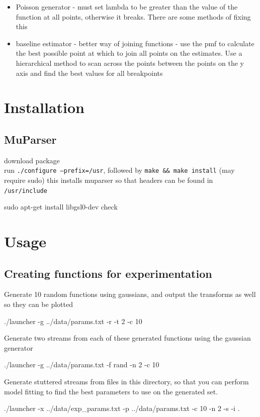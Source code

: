 \documentclass[a4paper,11pt]{article}
\begin{document}
\begin{itemize}
\item Poisson generator - must set lambda to be greater than the value of the
  function at all points, otherwise it breaks. There are some methods of fixing this
\item baseline estimator - better way of joining functions - use the pmf to
  calculate the best possible point at which to join all points on the
  estimates. Use a hierarchical method to scan across the points between the
  points on the y axis and find the best values for all breakpoints
\end{itemize}
\newpage
\printbibliography
\newpage
\begin{appendices}
\section{Installation}
\label{sec-9}
\subsection{MuParser}
\label{sec-9-1}

 download package\\
 run \texttt{./configure --prefix=/usr}, followed by \texttt{make \&\& make install} (may require sudo)
 this installs muparser so that headers can be found in \texttt{/usr/include}
 \begin{verbatimtab}   
 sudo apt-get install libgsl0-dev check 
 \end{verbatimtab}
\section{Usage}
\label{sec-10}
\subsection{Creating functions for experimentation}
\label{sec-10-1}

   Generate 10 random functions using gaussians, and output the transforms as
   well so they can be plotted
   \begin{verbatimtab}
   ./launcher -g ../data/params.txt -r -t 2 -c 10
   \end{verbatimtab}
   Generate two streams from each of these generated functions using the
   gaussian generator
   \begin{verbatimtab}
   ./launcher -g ../data/params.txt -f rand -n 2 -c 10
   \end{verbatimtab}
   Generate stuttered streams from files in this directory, so that you can
   perform model fitting to find the best parameters to use on the generated
   set.
   \begin{verbatimtab}
   ./launcher -x ../data/exp_params.txt -p ../data/params.txt -c 10 -n 2 -s -i .
   \end{verbatimtab}
   
\end{appendices}
\end{document}
